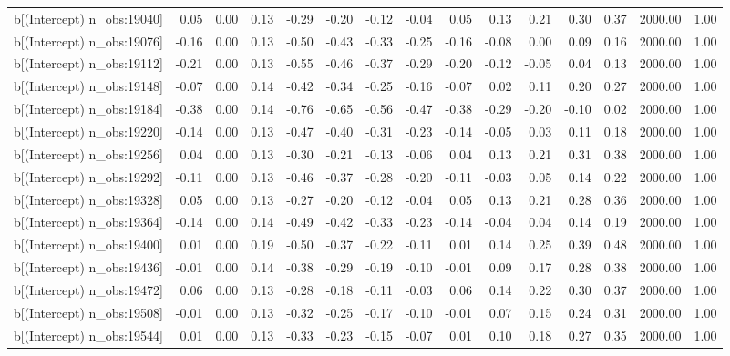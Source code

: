 \begin{table}[ht]
\begin{tabular}{rrrrrrrrrrrrrrr}
  b[(Intercept) n\_obs:19040] & 0.05 & 0.00 & 0.13 & -0.29 & -0.20 & -0.12 & -0.04 & 0.05 & 0.13 & 0.21 & 0.30 & 0.37 & 2000.00 & 1.00 \\ 
  b[(Intercept) n\_obs:19076] & -0.16 & 0.00 & 0.13 & -0.50 & -0.43 & -0.33 & -0.25 & -0.16 & -0.08 & 0.00 & 0.09 & 0.16 & 2000.00 & 1.00 \\ 
  b[(Intercept) n\_obs:19112] & -0.21 & 0.00 & 0.13 & -0.55 & -0.46 & -0.37 & -0.29 & -0.20 & -0.12 & -0.05 & 0.04 & 0.13 & 2000.00 & 1.00 \\ 
  b[(Intercept) n\_obs:19148] & -0.07 & 0.00 & 0.14 & -0.42 & -0.34 & -0.25 & -0.16 & -0.07 & 0.02 & 0.11 & 0.20 & 0.27 & 2000.00 & 1.00 \\ 
  b[(Intercept) n\_obs:19184] & -0.38 & 0.00 & 0.14 & -0.76 & -0.65 & -0.56 & -0.47 & -0.38 & -0.29 & -0.20 & -0.10 & 0.02 & 2000.00 & 1.00 \\ 
  b[(Intercept) n\_obs:19220] & -0.14 & 0.00 & 0.13 & -0.47 & -0.40 & -0.31 & -0.23 & -0.14 & -0.05 & 0.03 & 0.11 & 0.18 & 2000.00 & 1.00 \\ 
  b[(Intercept) n\_obs:19256] & 0.04 & 0.00 & 0.13 & -0.30 & -0.21 & -0.13 & -0.06 & 0.04 & 0.13 & 0.21 & 0.31 & 0.38 & 2000.00 & 1.00 \\ 
  b[(Intercept) n\_obs:19292] & -0.11 & 0.00 & 0.13 & -0.46 & -0.37 & -0.28 & -0.20 & -0.11 & -0.03 & 0.05 & 0.14 & 0.22 & 2000.00 & 1.00 \\ 
  b[(Intercept) n\_obs:19328] & 0.05 & 0.00 & 0.13 & -0.27 & -0.20 & -0.12 & -0.04 & 0.05 & 0.13 & 0.21 & 0.28 & 0.36 & 2000.00 & 1.00 \\ 
  b[(Intercept) n\_obs:19364] & -0.14 & 0.00 & 0.14 & -0.49 & -0.42 & -0.33 & -0.23 & -0.14 & -0.04 & 0.04 & 0.14 & 0.19 & 2000.00 & 1.00 \\ 
  b[(Intercept) n\_obs:19400] & 0.01 & 0.00 & 0.19 & -0.50 & -0.37 & -0.22 & -0.11 & 0.01 & 0.14 & 0.25 & 0.39 & 0.48 & 2000.00 & 1.00 \\ 
  b[(Intercept) n\_obs:19436] & -0.01 & 0.00 & 0.14 & -0.38 & -0.29 & -0.19 & -0.10 & -0.01 & 0.09 & 0.17 & 0.28 & 0.38 & 2000.00 & 1.00 \\ 
  b[(Intercept) n\_obs:19472] & 0.06 & 0.00 & 0.13 & -0.28 & -0.18 & -0.11 & -0.03 & 0.06 & 0.14 & 0.22 & 0.30 & 0.37 & 2000.00 & 1.00 \\ 
  b[(Intercept) n\_obs:19508] & -0.01 & 0.00 & 0.13 & -0.32 & -0.25 & -0.17 & -0.10 & -0.01 & 0.07 & 0.15 & 0.24 & 0.31 & 2000.00 & 1.00 \\ 
  b[(Intercept) n\_obs:19544] & 0.01 & 0.00 & 0.13 & -0.33 & -0.23 & -0.15 & -0.07 & 0.01 & 0.10 & 0.18 & 0.27 & 0.35 & 2000.00 & 1.00 \\ 

\end{tabular}
\end{table}

